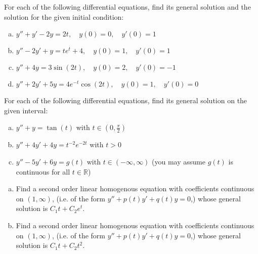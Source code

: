 \documentclass[12pt,letterpaper]{hmcpset}
\newcommand{\RR}{\mathbb{R}}
\begin{document}

\begin{problem}[E1]
    For each of the following differential equations,
    find its general solution and the solution for 
    the given initial condition:
    \begin{enumerate}[(a)]
        \item $y''+y'-2y= 2t,\quad y(0)= 0,\quad y'(0)= 1$
        \item $y''-2y'+y= te^t+4,\quad y(0)= 1,\quad y'(0)= 1$
        \item $y''+4y= 3\sin(2t),\quad y(0)= 2,\quad y'(0)= -1$
        \item $y''+2y'+5y= 4e^{-t}\cos(2t),\quad y(0)= 1,\quad y'(0)= 0$
    \end{enumerate}
\end{problem}

\begin{solution}
    \vfill
\end{solution}
\clearpage

\begin{problem}[E2]
    For each of the following differential equations,
    find its general solution on the given interval:   
    \begin{enumerate}[(a)]
        \item $y''+y=\tan(t)$ with $t\in(0,\frac{\pi}{2})$
        \item $y''+4y'+4y=t^{-2}e^{-2t}$ with $t>0$
        \item $y''-5y'+6y=g(t)$ with $t\in(-\infty,\infty)$
            (you may assume $g(t)$ is continuous for all
            $t\in\RR$)
    \end{enumerate}
\end{problem}

\begin{solution}
    \vfill
\end{solution}
\clearpage

\begin{problem}[E3]
    \begin{enumerate}[(a)]
        \item Find a second order linear homogenous equation
            with coefficients continuous on $(1,\infty)$,
            (i.e. of the form $y''+p(t)y'+q(t)y=0$,) whose
            general solution is $C_1t + C_2e^t$.
        \item Find a second order linear homogenous equation
            with coefficients continuous on $(1,\infty)$,
            (i.e. of the form $y''+p(t)y'+q(t)y=0$,) whose
            general solution is $C_1t + C_2t^2$.
    \end{enumerate}
\end{problem}
\end{document}
